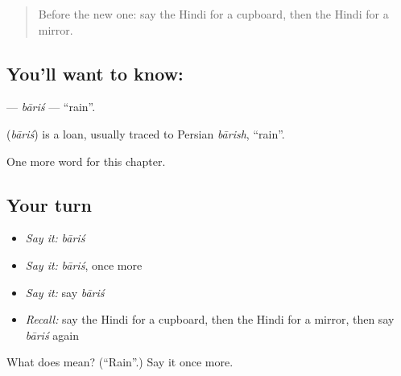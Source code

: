 \label{lesson:HI-C184-baris}



\begin{quote}
Before the new one: say the Hindi for a cupboard, then the Hindi for a mirror.
\end{quote}

\subsection*{You'll want to know: }
\textbf{} — \emph{bāriś} — \textquotedblleft{}rain\textquotedblright{}.

\begin{cousinweb}
\textbf{} (\emph{bāriś}) is a loan, usually traced to Persian \emph{bārish}, \textquotedblleft{}rain\textquotedblright{}.
\end{cousinweb}

\begin{grammarlens}[title={What you've built}]
One more word for this chapter.
\end{grammarlens}

\subsection*{Your turn}
\begin{itemize}
\raggedright
  \item \emph{Say it:} \emph{bāriś}
  \item \emph{Say it:} \emph{bāriś}, once more
  \item \emph{Say it:} say \emph{bāriś}
  \item \emph{Recall:} say the Hindi for a cupboard, then the Hindi for a mirror, then say \emph{bāriś} again
\end{itemize}

\begin{tcolorbox}[breakable,colback=teal!4,colframe=teal!35!black,title={Before you move on}]
What does  mean? (\textquotedblleft{}Rain\textquotedblright{}.) Say it once more.
\end{tcolorbox}
